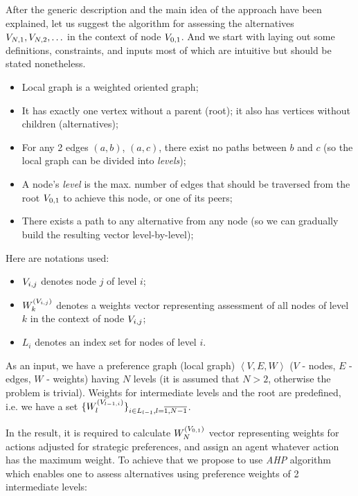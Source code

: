 After the generic description and the main idea of the approach have been explained, let us suggest the algorithm for
assessing the alternatives $V_{N,1}, V_{N,2},\ldots$ in the context of node $V_{0,1}$. And we start with laying out some definitions,
constraints, and inputs most of which are intuitive but should be stated nonetheless.

\begin{itemize}
    \item Local graph is a weighted oriented graph;
    \item It has exactly one vertex without a parent (root); it also has vertices without children (alternatives);
    \item For any 2 edges $(a,b)$, $(a,c)$, there exist no paths between $b$ and $c$ (so the local
        graph can be divided into \textit{levels});
    \item A node's \textit{level} is the max. number of edges that should be traversed from the root $V_{0,1}$ to
        achieve this node, or one of its peers;
    \item There exists a path to any alternative from any node (so we can gradually build the
        resulting vector level-by-level);
\end{itemize}

Here are notations used:

\begin{itemize}
    \item $V_{i,j}$ denotes node $j$ of level $i$;
    \item $W_{k}^{(V_{i,j})}$ denotes a weights vector representing assessment of all nodes of level
        $k$ in the context of node $V_{i,j}$;
    \item $L_i$ denotes an index set for nodes of level $i$.
\end{itemize}

As an input, we have a preference graph (local graph) $\left< V, E, W \right>$ ($V$ - nodes, $E$ - edges, $W$ - weights)
having $N$ levels (it is assumed that $N>2$, otherwise the problem is trivial).
Weights for intermediate levels and the root are predefined, i.e. we have a set
$\{ W_{l}^{(V_{l-1,i})} \}_{i \in L_{l-1}, l = \overline{1, N-1}}
$.

In the result, it is required to calculate $W_{N}^{(V_{0,1})}$ vector representing weights for actions adjusted for
strategic preferences, and assign an agent whatever action has the maximum weight. To achieve that we propose to use
\textit{AHP} algorithm which enables one to assess alternatives using preference weights of 2 intermediate levels:

